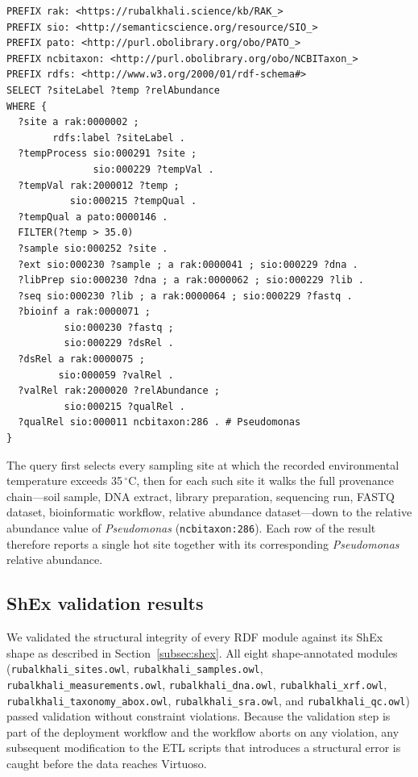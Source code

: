 \documentclass[11pt,a4paper]{article}
\begin{document}
\begin{lstlisting}[caption={SPARQL query joining environmental
    temperature and \emph{Pseudomonas} relative abundance.},
  label={lst:sparql_env_tax}, basicstyle=\ttfamily\scriptsize, frame=single]
PREFIX rak: <https://rubalkhali.science/kb/RAK_>
PREFIX sio: <http://semanticscience.org/resource/SIO_>
PREFIX pato: <http://purl.obolibrary.org/obo/PATO_>
PREFIX ncbitaxon: <http://purl.obolibrary.org/obo/NCBITaxon_>
PREFIX rdfs: <http://www.w3.org/2000/01/rdf-schema#>
SELECT ?siteLabel ?temp ?relAbundance
WHERE {
  ?site a rak:0000002 ;
        rdfs:label ?siteLabel .
  ?tempProcess sio:000291 ?site ;
               sio:000229 ?tempVal .
  ?tempVal rak:2000012 ?temp ;
           sio:000215 ?tempQual .
  ?tempQual a pato:0000146 .
  FILTER(?temp > 35.0)
  ?sample sio:000252 ?site .
  ?ext sio:000230 ?sample ; a rak:0000041 ; sio:000229 ?dna .
  ?libPrep sio:000230 ?dna ; a rak:0000062 ; sio:000229 ?lib .
  ?seq sio:000230 ?lib ; a rak:0000064 ; sio:000229 ?fastq .
  ?bioinf a rak:0000071 ;
          sio:000230 ?fastq ;
          sio:000229 ?dsRel .
  ?dsRel a rak:0000075 ;
         sio:000059 ?valRel .
  ?valRel rak:2000020 ?relAbundance ;
          sio:000215 ?qualRel .
  ?qualRel sio:000011 ncbitaxon:286 . # Pseudomonas
}
\end{lstlisting}

The query first selects every sampling site at which the recorded
environmental temperature exceeds 35\,$^{\circ}$C, then for each such
site it walks the full provenance chain---soil sample, DNA extract,
library preparation, sequencing run, FASTQ dataset, bioinformatic
workflow, relative abundance dataset---down to the relative abundance
value of \emph{Pseudomonas} (\texttt{ncbitaxon:286}). Each row of the
result therefore reports a single hot site together with its
corresponding \emph{Pseudomonas} relative abundance.

\subsection{ShEx validation results}

We validated the structural integrity of every RDF module against
its ShEx shape as described in Section~\ref{subsec:shex}. All eight
shape-annotated modules (\texttt{rubalkhali\_sites.owl},
\texttt{rubalkhali\_samples.owl},
\texttt{rubalkhali\_measurements.owl}, \texttt{rubalkhali\_dna.owl},
\texttt{rubalkhali\_xrf.owl},
\texttt{rubalkhali\_taxonomy\_abox.owl},
\texttt{rubalkhali\_sra.owl}, and \texttt{rubalkhali\_qc.owl}) passed
validation without constraint violations. Because the validation
step is part of the deployment workflow and the workflow aborts on
any violation, any subsequent modification to the ETL scripts that
introduces a structural error is caught before the data reaches
Virtuoso.
\end{document}
